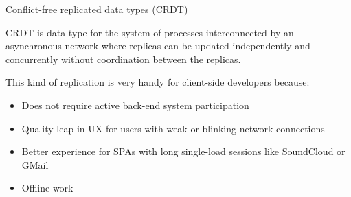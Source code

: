 \documentclass{beamer}
\begin{document}
\begin{frame}{Conflict-free replicated data types (CRDT)}
\begin{block}{CRDT is}
data type for the system of processes interconnected by an asynchronous network
where replicas can be updated independently and concurrently without coordination
between the replicas.
\end{block}
\vspace{0.5cm}
This kind of replication is very handy for client-side developers because:
\begin{itemize}
	\item Does not require active back-end system participation
	\item Quality leap in UX for users with weak or blinking network connections
	\item Better experience for SPAs with long single-load sessions like SoundCloud or GMail
	\item Offline work
\end{itemize}
\end{frame}
\end{document}
